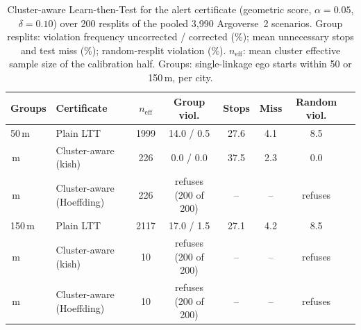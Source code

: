 \documentclass[lettersize,journal]{IEEEtran}
\begin{document}
\begin{table}[t]
\caption{Cluster-aware Learn-then-Test for the alert certificate (geometric score, $\alpha=0.05$, $\delta=0.10$) over 200 resplits of the pooled 3{,}990 Argoverse~2 scenarios. Group resplits: violation frequency uncorrected / corrected (\%); mean unnecessary stops and test miss (\%); random-resplit violation (\%). $n_{\mathrm{eff}}$: mean cluster effective sample size of the calibration half. Groups: single-linkage ego starts within 50 or 150\,m, per city.}
\label{tab:s-a15}
\centering
\scriptsize\setlength{\tabcolsep}{2.5pt}
\begin{tabular}{llcccccc}
\toprule
Groups & Certificate & $n_{\mathrm{eff}}$ & Group viol. & Stops & Miss & Random viol. \\
\midrule
50\,m & Plain LTT & 1999 & 14.0 / 0.5 & 27.6 & 4.1 & 8.5 \\
\,m & Cluster-aware (kish) & 226 & 0.0 / 0.0 & 37.5 & 2.3 & 0.0 \\
\,m & Cluster-aware (Hoeffding) & 226 & refuses (200 of 200) & -- & -- & refuses \\
\midrule
150\,m & Plain LTT & 2117 & 17.0 / 1.5 & 27.1 & 4.2 & 8.5 \\
\,m & Cluster-aware (kish) & 10 & refuses (200 of 200) & -- & -- & refuses \\
\,m & Cluster-aware (Hoeffding) & 10 & refuses (200 of 200) & -- & -- & refuses \\
\bottomrule
\end{tabular}
\end{table}
\end{document}
